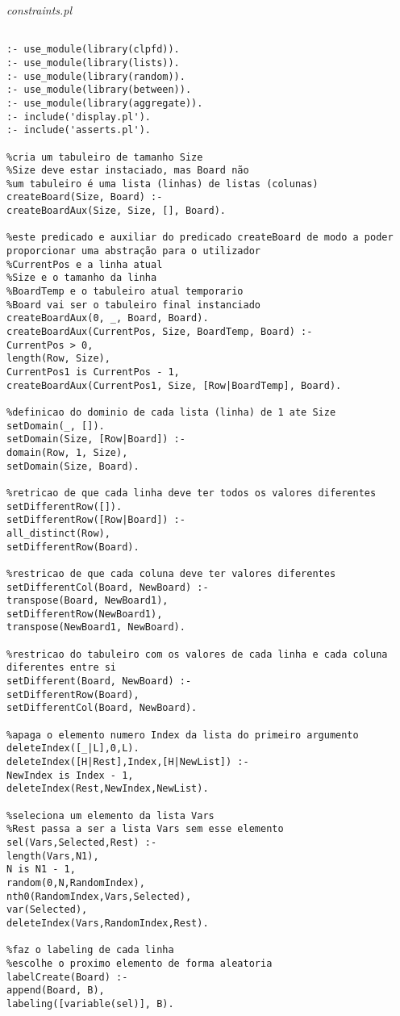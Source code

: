 \documentclass[runningheads,a4paper]{llncs}
\begin{document}
	\noindent
	{\it constraints.pl}
	\begin{changemargin}{-3cm}{-4cm}
		\begin{verbatim}
		
:- use_module(library(clpfd)).
:- use_module(library(lists)).
:- use_module(library(random)).
:- use_module(library(between)).
:- use_module(library(aggregate)).
:- include('display.pl').
:- include('asserts.pl').

%cria um tabuleiro de tamanho Size
%Size deve estar instaciado, mas Board não
%um tabuleiro é uma lista (linhas) de listas (colunas)
createBoard(Size, Board) :-
createBoardAux(Size, Size, [], Board).

%este predicado e auxiliar do predicado createBoard de modo a poder proporcionar uma abstração para o utilizador
%CurrentPos e a linha atual
%Size e o tamanho da linha
%BoardTemp e o tabuleiro atual temporario
%Board vai ser o tabuleiro final instanciado
createBoardAux(0, _, Board, Board).
createBoardAux(CurrentPos, Size, BoardTemp, Board) :-
CurrentPos > 0,
length(Row, Size),
CurrentPos1 is CurrentPos - 1,
createBoardAux(CurrentPos1, Size, [Row|BoardTemp], Board).

%definicao do dominio de cada lista (linha) de 1 ate Size
setDomain(_, []).
setDomain(Size, [Row|Board]) :-
domain(Row, 1, Size),
setDomain(Size, Board).

%retricao de que cada linha deve ter todos os valores diferentes
setDifferentRow([]).
setDifferentRow([Row|Board]) :-
all_distinct(Row),
setDifferentRow(Board).

%restricao de que cada coluna deve ter valores diferentes
setDifferentCol(Board, NewBoard) :-
transpose(Board, NewBoard1),
setDifferentRow(NewBoard1),
transpose(NewBoard1, NewBoard).

%restricao do tabuleiro com os valores de cada linha e cada coluna diferentes entre si
setDifferent(Board, NewBoard) :-
setDifferentRow(Board),
setDifferentCol(Board, NewBoard).

%apaga o elemento numero Index da lista do primeiro argumento
deleteIndex([_|L],0,L).
deleteIndex([H|Rest],Index,[H|NewList]) :-
NewIndex is Index - 1,
deleteIndex(Rest,NewIndex,NewList).

%seleciona um elemento da lista Vars
%Rest passa a ser a lista Vars sem esse elemento
sel(Vars,Selected,Rest) :-
length(Vars,N1),
N is N1 - 1,
random(0,N,RandomIndex),
nth0(RandomIndex,Vars,Selected),
var(Selected),
deleteIndex(Vars,RandomIndex,Rest).

%faz o labeling de cada linha
%escolhe o proximo elemento de forma aleatoria
labelCreate(Board) :-
append(Board, B),
labeling([variable(sel)], B).


\end{verbatim}
\end{changemargin}
\end{document}
